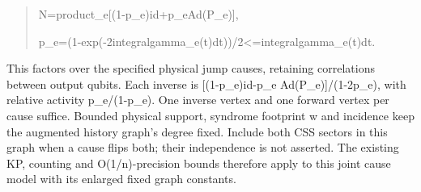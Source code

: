 \documentclass[
]{article}
\begin{document}
\begin{quote}\small\ttfamily\raggedright\setlength{\parskip}{0pt}
\noindent N\allowbreak{}=\allowbreak{}p\allowbreak{}r\allowbreak{}o\allowbreak{}d\allowbreak{}u\allowbreak{}c\allowbreak{}t\allowbreak{}\_\allowbreak{}e\allowbreak{}[\allowbreak{}(\allowbreak{}1\allowbreak{}-\allowbreak{}p\allowbreak{}\_\allowbreak{}e\allowbreak{})\allowbreak{}i\allowbreak{}d\allowbreak{}+\allowbreak{}p\allowbreak{}\_\allowbreak{}e\allowbreak{}\hspace*{0.525em}\allowbreak{}A\allowbreak{}d\allowbreak{}(\allowbreak{}P\allowbreak{}\_\allowbreak{}e\allowbreak{})\allowbreak{}]\allowbreak{},\par
\noindent p\allowbreak{}\_\allowbreak{}e\allowbreak{}=\allowbreak{}(\allowbreak{}1\allowbreak{}-\allowbreak{}e\allowbreak{}x\allowbreak{}p\allowbreak{}(\allowbreak{}-\allowbreak{}2\allowbreak{}\hspace*{0.525em}\allowbreak{}i\allowbreak{}n\allowbreak{}t\allowbreak{}e\allowbreak{}g\allowbreak{}r\allowbreak{}a\allowbreak{}l\allowbreak{}\hspace*{0.525em}\allowbreak{}g\allowbreak{}a\allowbreak{}m\allowbreak{}m\allowbreak{}a\allowbreak{}\_\allowbreak{}e\allowbreak{}(\allowbreak{}t\allowbreak{})\allowbreak{}d\allowbreak{}t\allowbreak{})\allowbreak{})\allowbreak{}/\allowbreak{}2\allowbreak{}\hspace*{0.525em}\allowbreak{}<\allowbreak{}=\allowbreak{}\hspace*{0.525em}\allowbreak{}i\allowbreak{}n\allowbreak{}t\allowbreak{}e\allowbreak{}g\allowbreak{}r\allowbreak{}a\allowbreak{}l\allowbreak{}\hspace*{0.525em}\allowbreak{}g\allowbreak{}a\allowbreak{}m\allowbreak{}m\allowbreak{}a\allowbreak{}\_\allowbreak{}e\allowbreak{}(\allowbreak{}t\allowbreak{})\allowbreak{}d\allowbreak{}t\allowbreak{}.\par
\end{quote}

This factors over the specified physical jump causes, retaining
correlations between output qubits. Each inverse is {[}(1-p\_e)id-p\_e
A\allowbreak{}d\allowbreak{}(\allowbreak{}P\allowbreak{}\_\allowbreak{}e\allowbreak{})\allowbreak{}]\allowbreak{}/\allowbreak{}(\allowbreak{}1\allowbreak{}-\allowbreak{}2\allowbreak{}p\allowbreak{}\_\allowbreak{}e\allowbreak{})\allowbreak{},
with relative activity p\_e/(1-p\_e). One inverse vertex and one forward
vertex per cause suffice. Bounded physical support, syndrome footprint w
and incidence keep the augmented history graph's degree fixed. Include
both CSS sectors in this graph when a cause flips both; their
independence is not asserted. The existing KP, counting and
O\allowbreak{}(\allowbreak{}1\allowbreak{}/\allowbreak{}n\allowbreak{})\allowbreak{}-\allowbreak{}p\allowbreak{}r\allowbreak{}e\allowbreak{}c\allowbreak{}i\allowbreak{}s\allowbreak{}i\allowbreak{}o\allowbreak{}n
bounds therefore apply to this joint cause model with its enlarged fixed
graph constants.
\end{document}
